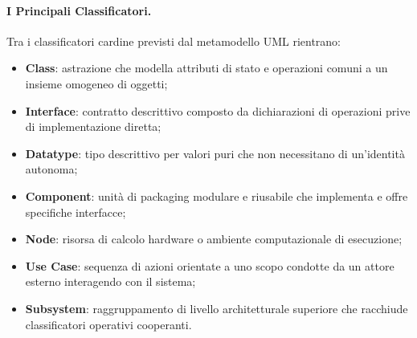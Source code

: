 \documentclass[12pt]{extarticle}
\begin{document}
\begin{figure}[htbp]
    \centering
{}
    \label{fig:uml_entities_hierarchy}
\end{figure}

\paragraph{I Principali Classificatori.}
Tra i classificatori cardine previsti dal metamodello UML rientrano:
\begin{itemize}
    \item \textbf{Class}: astrazione che modella attributi di stato e operazioni comuni a un insieme omogeneo di oggetti;
    \item \textbf{Interface}: contratto descrittivo composto da dichiarazioni di operazioni prive di implementazione diretta;
    \item \textbf{Datatype}: tipo descrittivo per valori puri che non necessitano di un'identità autonoma;
    \item \textbf{Component}: unità di packaging modulare e riusabile che implementa e offre specifiche interfacce;
    \item \textbf{Node}: risorsa di calcolo hardware o ambiente computazionale di esecuzione;
    \item \textbf{Use Case}: sequenza di azioni orientate a uno scopo condotte da un attore esterno interagendo con il sistema;
    \item \textbf{Subsystem}: raggruppamento di livello architetturale superiore che racchiude classificatori operativi cooperanti.
\end{itemize}
\end{document}
